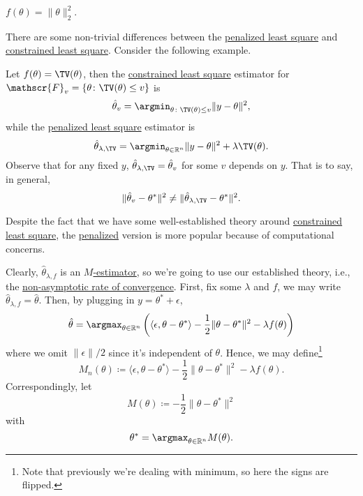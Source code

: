 \begin{eg}
	\(f(\theta ) = \lVert \theta \rVert _2^2 \).
\end{eg}

There are some non-trivial differences between the \hyperref[prb:penalized-LS]{penalized least square} and \hyperref[prb:constrained-LS]{constrained least square}. Consider the following example.

\begin{eg}
	Let \(f(\theta ) = \TV(\theta ) \), then the \hyperref[prb:constrained-LS]{constrained least square} estimator for \(\mathscr{F}_v = \{ \theta \colon \TV(\theta ) \leq v\} \) is
	\[
		\hat{\theta} _v = \argmin_{\theta \colon \TV(\theta ) \leq v} \lVert y - \theta \rVert ^2,
	\]
	while the \hyperref[prb:penalized-LS]{penalized least square} estimator is
	\[
		\hat{\theta} _{\lambda , \TV} = \argmin_{\theta \in \mathbb{R} ^n} \lVert y - \theta  \rVert ^2 + \lambda \TV(\theta ) .
	\]
	Observe that for any fixed \(y\), \(\hat{\theta} _{\lambda , \TV } = \hat{\theta} _v\) for some \(v\) depends on \(y\). That is to say, in general,
	\[
		\lVert \hat{\theta} _v - \theta ^{\ast}  \rVert ^2 \neq \lVert \hat{\theta} _{\lambda , \TV } - \theta ^{\ast} \rVert ^2 .
	\]
\end{eg}

\begin{remark}
	Despite the fact that we have some well-established theory around \hyperref[prb:constrained-LS]{constrained least square}, the \hyperref[prb:penalized-LS]{penalized} version is more popular because of computational concerns.
\end{remark}

Clearly, \(\hat{\theta} _{\lambda , f}\) is an \hyperref[prb:M-estimation]{\(M\)-estimator}, so we're going to use our established theory, i.e., the \hyperref[thm:non-asymptotic-rate-of-convergence]{non-asymptotic rate of convergence}. First, fix some \(\lambda \) and \(f\), we may write \(\hat{\theta} _{\lambda , f} = \hat{\theta} \). Then, by plugging in \(y = \theta ^{\ast} + \epsilon \),
\[
	\hat{\theta} = \argmax_{\theta \in \mathbb{R} ^n} \left( \langle \epsilon , \theta - \theta ^{\ast}  \rangle - \frac{1}{2} \lVert \theta - \theta ^{\ast}  \rVert ^2 - \lambda f(\theta )  \right)
\]
where we omit \(\lVert \epsilon \rVert / 2\) since it's independent of \(\theta \). Hence, we may define\footnote{Note that previously we're dealing with minimum, so here the signs are flipped.}
\[
	M_n(\theta ) \coloneqq \langle \epsilon , \theta - \theta ^{\ast} \rangle - \frac{1}{2} \lVert \theta - \theta ^{\ast} \rVert ^2 - \lambda f(\theta ).
\]
Correspondingly, let
\[
	M(\theta ) \coloneqq -\frac{1}{2} \lVert \theta - \theta ^{\ast}  \rVert ^2
\]
with
\[
	\theta ^{\ast} = \argmax_{\theta \in \mathbb{R} ^n} M(\theta ).
\]

